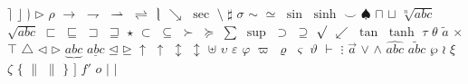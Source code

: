 \documentclass{proc}
\begin{document}
  $\rceil$
  $\rfloor$
  $\rgroup$
  $\rhd$
  $\rho$
  $\rightarrow$
  $\rightharpoondown$
  $\rightharpoonup$
  $\rightleftharpoons$
  $\rmoustache$
  $\searrow$
  $\sec$
  $\setminus$
  $\sharp$
  $\sigma$
  $\sim$
  $\simeq$
  $\sin$
  $\sinh$
  $\smile$
  $\spadesuit$
  $\sqcap$
  $\sqcup$
  $\sqrt[n]{abc}$
  $\sqrt{abc}$
  $\sqsubset$
  $\sqsubseteq$
  $\sqsupset$
  $\sqsupseteq$
  $\star$
  $\subset$
  $\subseteq$
  $\succ$
  $\succeq$
  $\sum$
  $\sup$
  $\supset$
  $\supseteq$
  $\surd$
  $\swarrow$
  $\tan$
  $\tanh$
  $\tau$
  $\theta$
  $\tilde{a}$
  $\times$
  $\top$
  $\triangle$
  $\triangleleft$
  $\triangleright$
  $\underbrace{abc}$
  $\underline{abc}$
  $\unlhd$
  $\unrhd$
  $\uparrow$
  $\uparrow$
  $\updownarrow$
  $\updownarrow$
  $\uplus$
  $\upsilon$
  $\varepsilon$
  $\varphi$
  $\varpi$
  $\varrho$
  $\varsigma$
  $\vartheta$
  $\vdash$
  $\vdots$
  $\vec{a}$
  $\vee$
  $\wedge$
  $\widehat{abc}$
  $\widetilde{abc}$
  $\wp$
  $\wr$
  $\xi$
  $\zeta$
  $\{$
  $\|$
  $\|$
  $\}$
  $]$
  $f'$
  $o$
  $|$
  $|$
\end{document}
